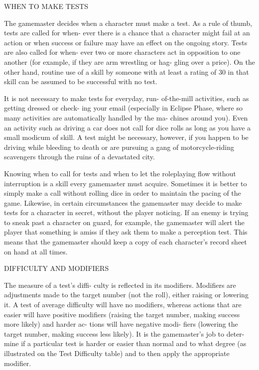 WHEN TO MAKE TESTS

The gamemaster decides when a character must make
a test. As a rule of thumb, tests are called for when-
ever there is a chance that a character might fail at an
action or when success or failure may have an effect
on the ongoing story. Tests are also called for when-
ever two or more characters act in opposition to one
another (for example, if they are arm wrestling or hag-
gling over a price). On the other hand, routine use of
a skill by someone with at least a rating of 30 in that
skill can be assumed to be successful with no test.

It is not necessary to make tests for everyday, run-
of-the-mill activities, such as getting dressed or check-
ing your email (especially in Eclipse Phase, where so
many activities are automatically handled by the ma-
chines around you). Even an activity such as driving
a car does not call for dice rolls as long as you have
a small modicum of skill. A test might be necessary,
however, if you happen to be driving while bleeding
to death or are pursuing a gang of motorcycle-riding
scavengers through the ruins of a devastated city.

Knowing when to call for tests and when to let the
roleplaying flow without interruption is a skill every
gamemaster must acquire. Sometimes it is better to
simply make a call without rolling dice in order to
maintain the pacing of the game. Likewise, in certain
circumstances the gamemaster may decide to make tests
for a character in secret, without the player noticing. If
an enemy is trying to sneak past a character on guard,
for example, the gamemaster will alert the player that
something is amiss if they ask them to make a perception
test. This means that the gamemaster should keep a copy
of each character's record sheet on hand at all times.

DIFFICULTY AND MODIFIERS

The measure of a test's diffi-
culty is reflected in its modifiers.
Modifiers are adjustments made
to the target number (not the
roll), either raising or lowering
it. A test of average difficulty
will have no modifiers, whereas
actions that are easier will have
positive modifiers (raising the
target number, making success
more likely) and harder ac-
tions will have negative modi-
fiers (lowering the target number,
making success less likely). It is
the gamemaster's job to deter-
mine if a particular test is harder
or easier than normal and to
what degree (as illustrated on the
Test Difficulty table) and to then
apply the appropriate modifier.

